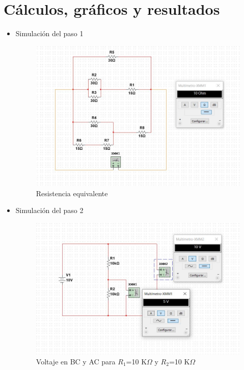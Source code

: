 \documentclass[twoside,twocolumn]{article}
\begin{document}
\section{Cálculos, gráficos y resultados}

\begin{itemize}
\item Simulación del paso 1
    \begin{figure}[h]
    \centering
    \includegraphics[scale=0.45]{imagenes1/1.b.JPG}
    \caption{Resistencia equivalente}
    \label{fig:circuito1}
    \end{figure}
\newpage    
\item Simulación del paso 2
    \begin{figure}[h]
    \centering
    \includegraphics[scale=0.3]{imagenes1/2.1.JPG}
    \caption{Voltaje en BC y AC para $R_{1}$=10 K$\Omega$ y $R_{2}$=10 K$\Omega$}
    \label{fig:circuito1}
    \end{figure}
    

\end{itemize}
\end{document}

